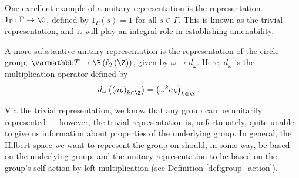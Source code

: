 \begin{example}\label{ex:some_representations}
  One excellent example of a unitary representation is the representation $1_{\Gamma}\colon \Gamma\rightarrow \C$, defined by $1_{\Gamma}(s) = 1$ for all $s\in\Gamma$. This is known as the trivial representation, and it will play an integral role in establishing amenability.\newline

  A more substantive unitary representation is the representation of the circle group, $\mathbb{T}\rightarrow \B\left(\ell_2\left(\Z\right)\right)$, given by $\omega \mapsto d_{\omega}$. Here, $d_{\omega}$ is the multiplication operator defined by
  \begin{align*}
    d_{\omega}\left(\left(a_{k}\right)_{k\in\Z}\right) &= \left(\omega^k a_{k}\right)_{k\in\Z}.
  \end{align*}
\end{example}
Via the trivial representation, we know that any group can be unitarily represented --- however, the trivial representation is, unfortunately, quite unable to give us information about properties of the underlying group. In general, the Hilbert space we want to represent the group on should, in some way, be based on the underlying group, and the unitary representation to be based on the group's self-action by left-multiplication (see Definition \ref{def:group_action}).\newline

